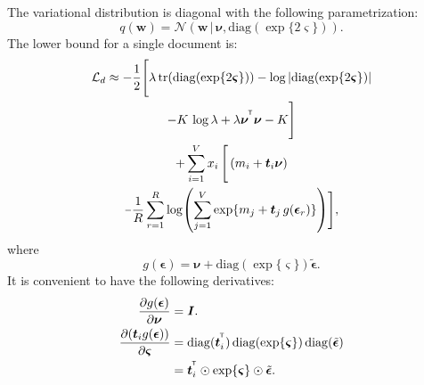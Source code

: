 \documentclass[journal]{IEEEtran}
\def\-{\scalebox{0.75}[1.0]{$-$}}
\newcommand*{\T}{^{\mkern-1.2mu\mathsf{T}}}     \newcommand*{\I}{^{\mkern-1.2mu\mathsf{-1}}}    \newcommand*{\IT}{^{\mkern-1.2mu\mathsf{-T}}}   \newcommand*{\ts}{_{\mkern-1.2mu\mathsf{t}}}    \newcommand{\nr}[1]{_{\mkern+2.0mu\mathsf{#1}}}
\newcommand{\mb}[1]{\bm{#1}}
\newcommand{\bs}[1]{\bm{#1}}
\def\veps{{\bs{\epsilon}}}
\def\vnu{{\bs{\nu}}}
\def\mI{{\mb{I}}}
\def\tileps{{\tilde{\bs{\epsilon}}}}
\begin{document}
The variational distribution is diagonal with the following parametrization:
\begin{equation}
q(\mb{w}) = \mathcal{N}(\mb{w} \,|\, \mb{\nu}, \mathrm{diag}(\exp\{2\mb{\varsigma}\})).
 \end{equation}
The lower bound for a single document is:
\begin{multline}
\mathcal{L}_d \approx -\frac{1}{2} \Bigg[
\lambda \, \mathrm{tr}(\mathrm{diag}(\exp\{2\mb{\varsigma}\})) 
- \log|\mathrm{diag}(\exp\{2\mb{\varsigma}\})| \\ - K \, \log \lambda +  \lambda \mb{\nu}^{\T}\mb{\nu} - K\Bigg] \\
+\sum_{i=1}^{V} x_i \, \Bigg[\,(m_i + \mb{t}_i \bs{\nu}) \\ 
\- \frac{1}{R}\sum_{r=1}^{R} \log (\sum_{j=1}^{V} \exp\{m_j + \mb{t}_j\,g(\bs{\epsilon}_{r})\}) \Bigg], \\
 \label{eq:app_obj_baysmm}
\end{multline}
where
\begin{equation}
g(\mb{\epsilon}) = \mb{\nu} + \mathrm{diag}(\exp\{\mb{\varsigma}\}) \tileps.
\end{equation}
It is convenient to have the following derivatives:
\begin{align}
\pdv{g(\veps)}{\vnu} &= \mI \label{eq:app_derv_g_nu}. \\
\pdv{(\mb{t}_i g(\bs{\epsilon}))}{\mb{\varsigma}} &= \mathrm{diag}(\mb{t}_i^{\T})\, \mathrm{diag}(\exp\{\mb{\varsigma}\})\, \mathrm{diag}(\tileps) \nonumber \\
&= \mb{t}_i^{\T} \odot \exp\{\mb{\varsigma}\} \odot \tileps. \label{eq:app_derv_g_l}
\end{align}
\end{document}
